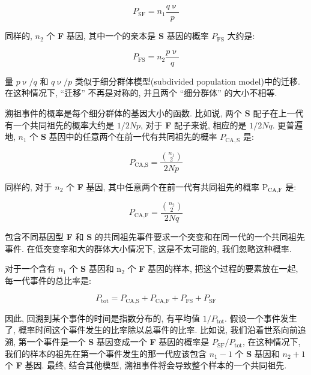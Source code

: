 \documentclass[
    12pt,%
    ]{article}
\begin{document}
\begin{equation*}
    P_{\text{SF}}=n_{1}\frac{q\upnu}{p}
\end{equation*}

同样的, $n_{2}$ 个 \textbf{F} 基因, 其中一个的亲本是 \textbf{S} 基因的概率 $P_{\text{FS}}$ 大约是: \newline

\begin{equation*}
    P_{\text{FS}}=n_{2}\frac{p\upnu}{q}
\end{equation*}

量 $p\upnu/q$ 和 $q\upnu/p$ 类似于细分群体模型(subdivided population model)中的迁移. 在这种情况下, ``迁移''
不再是对称的, 并且两个 ``细分群体'' 的大小不相等.

溯祖事件的概率是每个细分群体的基因大小的函数. 比如说, 两个 \textbf{S} 配子在上一代有一个共同祖先的概率大约是 $1/2Np$,
对于 \textbf{F} 配子来说, 相应的是 $1/2Nq$. 更普遍地, $n_{1}$ 个 \textbf{S}
基因中的任意两个在前一代有共同祖先的概率 $P_{\text{CA},\mathrm{S}}$ 是:

\begin{equation*}
    P_{\text{CA},\text{S}}=\frac{\binom{n_1}{2}}{2Np}
\end{equation*}

同样的, 对于 $n_{2}$ 个 \textbf{F} 基因, 其中任意两个在前一代有共同祖先的概率
$\text{P}_{\text{CA},\text{F}}$ 是:

\begin{equation*}
    P_{\text{CA},\text{F}}=\frac{\binom{n_2}{2}}{2Nq}
\end{equation*}

包含不同基因型 \textbf{F} 和 \textbf{S} 的共同祖先事件要求一个突变和在同一代的一个共同祖先事件.
在低突变率和大的群体大小情况下, 这是不太可能的, 我们忽略这种概率.

对于一个含有 $n_{1}$ 个 \textbf{S} 基因和 n$_{\text{2}}$ 个 \textbf{F} 基因的样本, 把这个过程的要素放在一起,
每一代事件的总比率是:

\begin{equation*}
    P_{\text{tot}} = P_{\text{CA},\text{S}} + P_{\text{CA},\text{F}} + P_{\text{FS}} + P_{\text{SF}}
\end{equation*}

因此, 回溯到某个事件的时间是指数分布的, 有平均值 $1/P_{\text{tot}}$. 假设一个事件发生了,
概率时间这个事件发生的比率除以总事件的比率. 比如说, 我们沿着世系向前追溯,
第一个事件是一个 \textbf{S} 基因变成一个 \textbf{F} 基因的概率是 $P_{\text{SF}}/P_{\text{tot}}$,
在这种情况下, 我们的样本的祖先在第一个事件发生的那一代应该包含 $n_{1}-1$ 个 \textbf{S} 基因和 $n_{2}+1$
个 \textbf{F} 基因. 最终, 结合其他模型, 溯祖事件将会导致整个样本的一个共同祖先.
\end{document}
